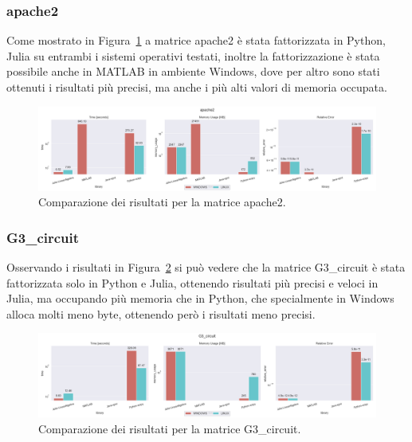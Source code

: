 \documentclass[a4paper, 12pt]{article}
\begin{document}
            \subsubsection{apache2}
                Come mostrato in Figura~\ref{fig:apache2} a matrice apache2 è 
                stata fattorizzata in Python, Julia su entrambi i sistemi 
                operativi testati, inoltre la fattorizzazione è stata possibile
                anche in MATLAB in ambiente Windows, dove per altro sono stati 
                ottenuti i risultati più precisi, ma anche i più alti valori di 
                memoria occupata.
                \begin{figure}[h]
                    \includegraphics[width=\textwidth]{apache2}
                    \caption{Comparazione dei risultati per la matrice apache2.}
                    \label{fig:apache2}
                \end{figure}
            \subsubsection{G3\_circuit}
                Osservando i risultati in Figura~\ref{fig:G3_circuit} si può
                vedere che la matrice G3\_circuit è stata fattorizzata solo in
                Python e Julia, ottenendo risultati più precisi e veloci in 
                Julia, ma occupando più memoria che in Python, che specialmente
                in Windows alloca molti meno byte, ottenendo però i risultati
                meno precisi.
                \begin{figure}[h]
                    \includegraphics[width=\textwidth]{G3_circuit}
                    \caption{Comparazione dei risultati per la matrice G3\_circuit.}
                    \label{fig:G3_circuit}
                \end{figure}
\end{document}
